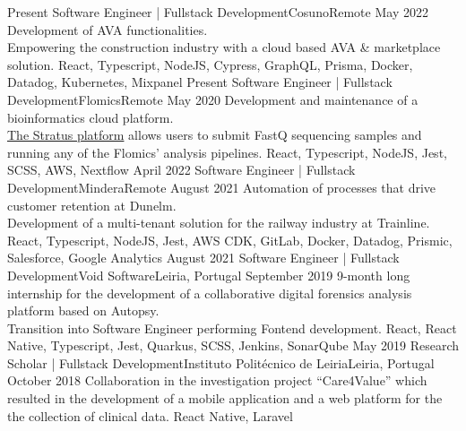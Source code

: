 %
%
%
\begin{experiences}
  \experience
  {Present} {Software Engineer | Fullstack Development}{Cosuno}{Remote}
  {May 2022} {Development of AVA functionalities.\\
    Empowering the construction industry with a cloud based AVA \& marketplace solution.}
  {React, Typescript, NodeJS, Cypress, GraphQL, Prisma, Docker, Datadog, Kubernetes, Mixpanel}
  \emptySeparator
  \experience
  {Present} {Software Engineer | Fullstack Development}{Flomics}{Remote}
  {May 2020}    {Development and maintenance of a bioinformatics cloud platform.\\
    \href{https://cloud.flomics.com}{The Stratus platform} allows users to submit FastQ sequencing samples and running any of the Flomics' analysis pipelines.}
  {React, Typescript, NodeJS, Jest, SCSS, AWS, Nextflow}
  \emptySeparator
  \experience
  {April 2022}   {Software Engineer | Fullstack Development}{Mindera}{Remote}
  {August 2021} {Automation of processes that drive customer retention at Dunelm.\\
    Development of a multi-tenant solution for the railway industry at Trainline.}
  {React, Typescript, NodeJS, Jest, AWS CDK, GitLab, Docker, Datadog, Prismic, Salesforce, Google Analytics}
  \emptySeparator
  \experience
  {August 2021}     {Software Engineer | Fullstack Development}{Void Software}{Leiria, Portugal}
  {September 2019}    {9-month long internship for the development of a collaborative digital forensics analysis
    platform based on Autopsy.\\
    Transition into Software Engineer performing Fontend development.}
  {React, React Native, Typescript, Jest, Quarkus, SCSS, Jenkins, SonarQube}
  \emptySeparator
  \emptySeparator
  \experience
  {May 2019}     {Research Scholar | Fullstack Development}{Instituto Politécnico de Leiria}{Leiria, Portugal}
  {October 2018}    {Collaboration in the investigation project “Care4Value” which resulted in
    the development of a mobile application and a web platform for the 
    the collection of clinical data.}
  {React Native, Laravel}
  \emptySeparator
\end{experiences}